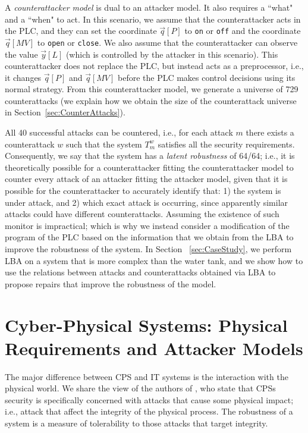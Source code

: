 A \emph{counterattacker model} is dual to an attacker model. It also requires a ``what" and a ``when" to act. In this scenario, we assume that the counterattacker acts in the PLC, and they can set the coordinate $\vec{q}[P]$ to \texttt{on} or \texttt{off} and the coordinate $\vec{q}[MV]$ to \texttt{open} or \texttt{close}. We also assume that the counterattacker can observe the value $\vec{y}[L]$ (which is controlled by the attacker in this scenario). This counterattacker does not replace the PLC, but instead acts as a preprocessor, i.e., it changes $\vec{q}[P]$ and $\vec{q}[MV]$ before the PLC makes control decisions using its normal strategy. From this counterattacker model, we generate a universe of 729 counterattacks (we explain how we obtain the size of the counterattack universe in Section~\ref{sec:CounterAttacks}). 

All 40 successful attacks can be countered, i.e., for each attack $m$ there exists a counterattack $w$ such that the system $T^w_m$ satisfies all the security requirements. Consequently, we say that the system has a \emph{latent robustness} of 64/64; i.e., it is theoretically possible for a counterattacker fitting the counterattacker model to counter every attack of an attacker fitting the attacker model, given that it is possible for the counterattacker to accurately identify that: 1) the system is under attack, and 2) which exact attack is occurring, since apparently similar attacks could have different counterattacks. Assuming the existence of such monitor is impractical; which is why we instead consider a modification of the program of the PLC based on the information that we obtain from the LBA to improve the robustness of the system. In Section ~\ref{sec:CaseStudy}, we perform LBA on a system that is more complex than the water tank, and we show how to use the relations between attacks and counterattacks obtained via LBA to propose repairs that improve the robustness of the model. 
 
\section{Cyber-Physical Systems: Physical Requirements and Attacker Models}
The major difference between CPS and IT systems is the interaction with the physical world. We share the view of the authors of \cite{CPSSecVinyl}, who state that CPSs security is {specifically} concerned with attacks that cause some physical impact; i.e., attack that affect the integrity of the physical process. The robustness of a system is a measure of tolerability to those attacks that target integrity.

